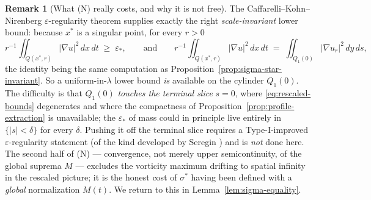 \documentclass[11pt]{article}
\theoremstyle{definition}
\newtheorem{remark}[theorem]{Remark}
\theoremstyle{remark}
\begin{document}
\begin{remark}[What (N) really costs, and why it is not free]
  \label{rem:N-discussion}
  The Caffarelli--Kohn--Nirenberg $\varepsilon$-regularity theorem
  \cite{CKN1982} supplies exactly the right \emph{scale-invariant} lower
  bound: because $x^*$ is a singular point, for every $r>0$
  \[
    r^{-1}\iint_{Q(x^*,r)}|\nabla u|^2\,dx\,dt \;\geq\;\varepsilon_* ,
    \qquad
    \text{and}\qquad
    r^{-1}\iint_{Q(x^*,r)}|\nabla u|^2\,dx\,dt
    \;=\;\iint_{Q_1(0)}|\nabla u_{r}|^2\,dy\,ds ,
  \]
  the identity being the same computation as
  Proposition~\ref{prop:sigma-star-invariant}. So a uniform-in-$\lambda$
  lower bound \emph{is} available on the cylinder $Q_1(0)$. The difficulty is
  that $Q_1(0)$ \emph{touches the terminal slice} $s=0$, where
  \eqref{eq:rescaled-bounds} degenerates and where the compactness of
  Proposition~\ref{prop:profile-extraction} is unavailable; the
  $\varepsilon_*$ of mass could in principle live entirely in
  $\{|s|<\delta\}$ for every $\delta$. Pushing it off the terminal slice
  requires a Type-I-improved $\varepsilon$-regularity statement (of the kind
  developed by Seregin \cite{Seregin2012}) and is \emph{not} done here. The
  second half of (N) --- convergence, not merely upper semicontinuity, of the
  global suprema $M$ --- excludes the vorticity maximum drifting to spatial
  infinity in the rescaled picture; it is the honest cost of $\sigma^*$
  having been defined with a \emph{global} normalization $M(t)$. We return to
  this in Lemma~\ref{lem:sigma-equality}.
\end{remark}
\end{document}
